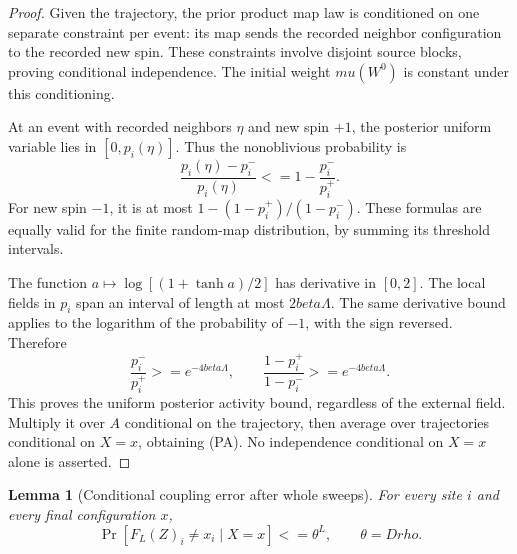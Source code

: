 \documentclass[11pt]{article}
\newtheorem{lemma}[theorem]{Lemma}
\theoremstyle{definition}
\theoremstyle{remark}
\def\beta{beta}\def\gamma{gamma}\def\lambda{lambda}%
\def\mu{mu}\def\rho{rho}\def\le{<=}\def\ge{>=}%
\begin{document}
\begin{proof}
Given the trajectory, the prior product map law is conditioned on one
separate constraint per event: its map sends the recorded neighbor
configuration to the recorded new spin. These constraints involve
disjoint source blocks, proving conditional independence. The initial
weight \(\mu(W^0)\) is constant under this conditioning.

At an event with recorded neighbors \(\eta\) and new spin \(+1\),
the posterior uniform variable lies in \([0,p_i(\eta)]\). Thus the
nonoblivious probability is
\[
 \frac{p_i(\eta)-p_i^-}{p_i(\eta)}
 \le1-\frac{p_i^-}{p_i^+}.
\]
For new spin \(-1\), it is at most
\(1-(1-p_i^+)/(1-p_i^-)\). These formulas are equally valid for
the finite random-map distribution, by summing its threshold intervals.

The function \(a\mapsto\log[(1+\tanh a)/2]\) has derivative in
\([0,2]\). The local fields in \(p_i\) span an interval of length
at most \(2\beta\Lambda\). The same derivative bound applies to
the logarithm of the probability of \(-1\), with the sign reversed.
Therefore
\[
 \frac{p_i^-}{p_i^+}\ge e^{-4\beta\Lambda},\qquad
 \frac{1-p_i^+}{1-p_i^-}\ge e^{-4\beta\Lambda}.
\]
This proves the uniform posterior activity bound, regardless of the
external field. Multiply it over \(A\) conditional on the trajectory,
then average over trajectories conditional on \(X=x\), obtaining
(PA). No independence conditional on \(X=x\) alone is asserted.
\end{proof}

\begin{lemma}[Conditional coupling error after whole sweeps]
\label{lem:resolution-dynamics-coupling}
For every site \(i\) and every final configuration \(x\),
\[
 \Pr[F_L(Z)_i\ne x_i\mid X=x]\le\theta^L,
 \qquad \theta=D\rho.
 \tag{CE}
\]
\end{lemma}
\end{document}
